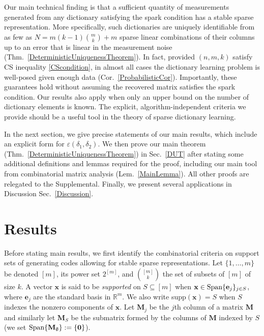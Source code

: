 \documentclass[9pt,twocolumn]{pnas-new}
\begin{document}
Our main technical finding is that a sufficient quantity of measurements generated from any dictionary satisfying the spark condition 
has a stable sparse representation.  More specifically, such dictionaries are uniquely identifiable from as few as \mbox{$N = m(k-1){m \choose k} + m$} sparse linear combinations of their columns up to an error that is linear in the measurement noise (Thm.~\ref{DeterministicUniquenessTheorem}). In fact, provided $(n, m, k)$ satisfy CS inequality \eqref{CScondition}, in almost all cases the dictionary learning problem is well-posed given enough data (Cor.~\ref{ProbabilisticCor}). Importantly, these guarantees hold without assuming the recovered matrix satisfies the spark condition. Our results  also apply when only an upper bound on the number of dictionary elements is known. The explicit, algorithm-independent criteria we provide should be a useful tool in the theory of sparse dictionary learning.  

In the next section, we give precise statements of our main results, which include an explicit form for $\varepsilon(\delta_1, \delta_2)$. We then prove our main theorem (Thm.~\ref{DeterministicUniquenessTheorem}) in Sec.~\ref{DUT} after stating some additional definitions and lemmas required for the proof, including our main tool from combinatorial matrix analysis (Lem.~\ref{MainLemma}). All other proofs are relegated to the Supplemental. 
Finally, we present several applications in Discussion Sec.~\ref{Discussion}.

\section{Results}

Before stating main results, we first identify the combinatorial criteria on support sets of generating codes allowing for stable sparse 
representations.  Let $\{1, \ldots, m\}$ be denoted $[m]$, its power set $2^{[m]}$, and ${[m] \choose k}$ the set of subsets of $[m]$ of size $k$. 
A vector $\mathbf{x}$ is said to be \emph{supported} on $S \subseteq [m]$ %
when $\mathbf{x} \in \text{\rm Span} \{\mathbf{e}_j\}_{j\in S}$, where $\mathbf{e}_j$ are the standard basis in $\mathbb R^m$.  We also write
 supp$(\mathbf{x}) = S$ when $S$ indexes the nonzero components of $\mathbf{x}$.
Let $\mathbf{M}_j$ be the $j$th column of a matrix $\mathbf{M}$ and similarly let $\mathbf{M}_S$ be the submatrix formed by the columns of $\mathbf{M}$ indexed by $S$ (we set $\text{\rm Span}\{\mathbf{M}_\emptyset\} := \{\textbf{0}\}$).  
\end{document}
